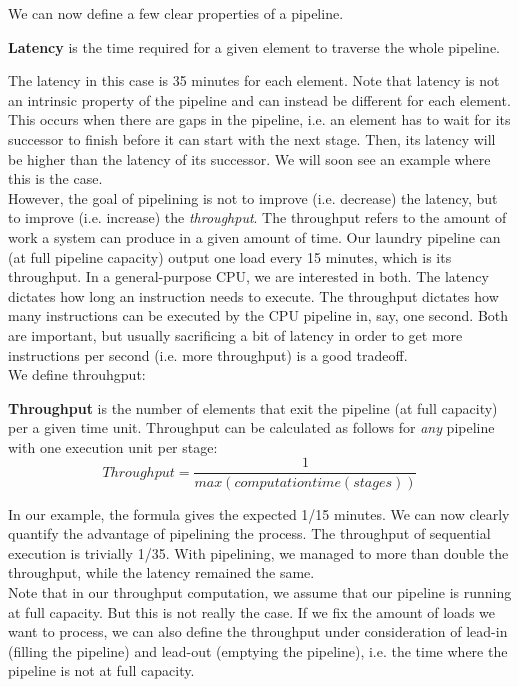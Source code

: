\documentclass[main.tex]{subfiles}
\begin{document}
We can now define a few clear properties of a pipeline.
\begin{definition}
    \textbf{Latency} is the time required for a given element to traverse the whole pipeline.
\end{definition}
\noindent The latency in this case is 35 minutes for each element. Note that latency is not an intrinsic property of the pipeline and can instead be different for each element. This occurs when there are gaps in the pipeline, i.e. an element has to wait for its successor to finish before it can start with the next stage. Then, its latency will be higher than the latency of its successor. We will soon see an example where this is the case.\\[3mm]
However, the goal of pipelining is not to improve (i.e. decrease) the latency, but to improve (i.e. increase) the \textit{throughput}. The throughput refers to the amount of work a system can produce in a given amount of time. Our laundry pipeline can (at full pipeline capacity) output one load every 15 minutes, which is its throughput. In a general-purpose CPU, we are interested in both. The latency dictates how long an instruction needs to execute. The throughput dictates how many instructions can be executed by the CPU pipeline in, say, one second. Both are important, but usually sacrificing a bit of latency in order to get more instructions per second (i.e. more throughput) is a good tradeoff.\\
We define throuhgput:
\begin{definition}
    \textbf{Throughput} is the number of elements that exit the pipeline (at full capacity) per a given time unit. Throughput can be calculated as follows for \textit{any} pipeline with one execution unit per stage:
    \begin{equation*}
        Throughput = \frac{1}{max(computationtime(stages))}
    \end{equation*}
\end{definition}
In our example, the formula gives the expected 1/15 minutes. We can now clearly quantify the advantage of pipelining the process. The throughput of sequential execution is trivially 1/35. With pipelining, we managed to more than double the throughput, while the latency remained the same.\\[3mm]
Note that in our throughput computation, we assume that our pipeline is running at full capacity. But this is not really the case. If we fix the amount of loads we want to process, we can also define the throughput under consideration of lead-in (filling the pipeline) and lead-out (emptying the pipeline), i.e. the time where the pipeline is not at full capacity.
\end{document}
